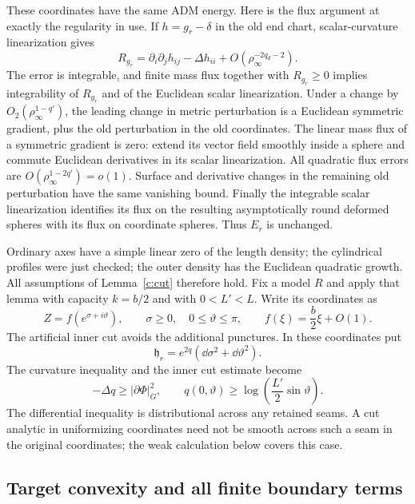 These coordinates have the same ADM energy.  Here is the flux argument
at exactly the regularity in use.  If $h=g_r-\delta$ in the old end chart,
scalar-curvature linearization gives
\[
 R_{g_r}=\partial_i\partial_j h_{ij}-\Delta h_{ii}
                  +O(\rho_\infty^{-2q_d-2}).
\]
The error is integrable, and finite mass flux together with $R_{g_r}\ge0$
implies integrability of $R_{g_r}$ and of the Euclidean scalar
linearization.  Under a change by
$O_2(\rho_\infty^{1-q'})$, the leading change in metric perturbation is
a Euclidean symmetric gradient, plus the old perturbation in the old
coordinates.  The linear mass flux of a symmetric gradient is zero:
extend its vector field smoothly inside a sphere and commute Euclidean
derivatives in its scalar linearization.  All quadratic flux errors are
$O(\rho_\infty^{1-2q'})=o(1)$.  Surface and derivative changes in the
remaining old perturbation have the same vanishing bound.  Finally the
integrable scalar linearization identifies its flux on the resulting
asymptotically round deformed spheres with its flux on coordinate spheres.
Thus $E_r$ is unchanged.

Ordinary axes have a simple linear zero of the length density; the
cylindrical profiles were just checked; the outer density has the
Euclidean quadratic growth.  All assumptions of Lemma~\ref{c:cut}
therefore hold.  Fix a model $R$ and apply that lemma with capacity
$k=b/2$ and with $0<L'<L$.  Write its coordinates as
\[
 Z=f(e^{\sigma+i\vartheta}),\qquad
 \sigma\ge0,\quad 0\le\vartheta\le\pi,
 \qquad f(\xi)=\frac b2\xi+O(1).
\]
The artificial inner cut avoids the additional punctures.  In these
coordinates put
\begin{equation}\label{r:log-density}
 \mathfrak h_r=e^{2q}(\dd\sigma^2+\dd\vartheta^2).
\end{equation}
The curvature inequality and the inner cut estimate become
\begin{equation}\label{r:strip-curvature-cut}
 -\Delta q\ge |\partial\Phi|_G^2,
 \qquad
 q(0,\vartheta)\ge\log\left(\frac{L'}2\sin\vartheta\right).
\end{equation}
The differential inequality is distributional across any retained seams.
A cut analytic in uniformizing coordinates need not be smooth across such
a seam in the original coordinates; the weak calculation below covers
this case.

\subsection{Target convexity and all finite boundary terms}
\label{r:weak-comparison}

